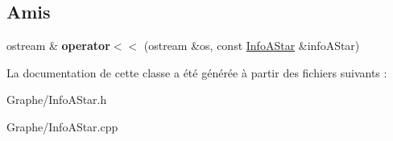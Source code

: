 \subsection*{Amis}
\begin{DoxyCompactItemize}
\item 
\mbox{\label{class_info_a_star_a205f8fe6f1bcec637dfdf3afb960bdcd}} 
ostream \& {\bfseries operator$<$$<$} (ostream \&os, const \mbox{\hyperlink{class_info_a_star}{Info\+A\+Star}} \&info\+A\+Star)
\end{DoxyCompactItemize}


La documentation de cette classe a été générée à partir des fichiers suivants \+:\begin{DoxyCompactItemize}
\item 
Graphe/Info\+A\+Star.\+h\item 
Graphe/Info\+A\+Star.\+cpp\end{DoxyCompactItemize}
